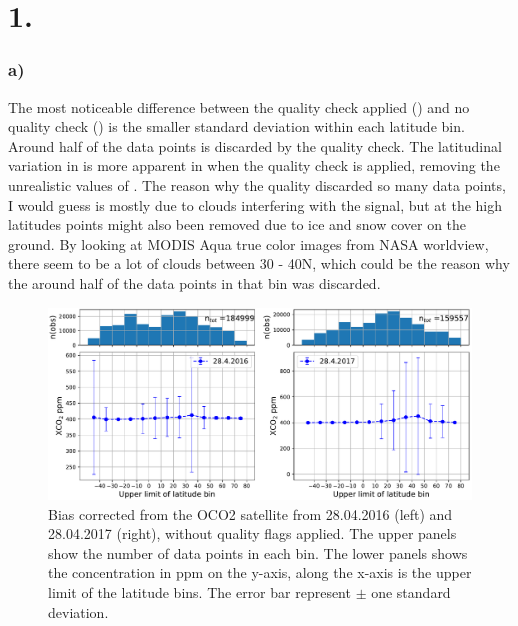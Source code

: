 \section*{1.}

\subsubsection*{a)}

The most noticeable difference between the quality check applied
() and no quality check ()
is the smaller standard deviation within each latitude bin. Around half of the
data points is discarded by the quality check. The latitudinal variation in
 is more apparent in when the quality check is applied, removing the
unrealistic values of . The reason why the quality discarded so many
data points, I would guess is mostly due to clouds interfering with the signal,
but at the high latitudes points might also been removed due to ice and snow
cover on the ground. By looking at MODIS Aqua true color images from NASA
worldview, there seem to be a lot of clouds between 30 - 40\degree N, which could
be the reason why the around half of the data points in that bin was discarded.   
\begin{figure}[htbp]
    \includegraphics[width=\textwidth]{../xCO2.pdf}
    \caption{Bias corrected  from the OCO2 satellite from 28.04.2016 (left) 
    and 28.04.2017 (right), without quality flags applied. The upper panels 
    show the number of data points in each bin. The lower panels shows the  
    concentration in ppm on the y-axis, along the x-axis is the upper limit of
    the latitude bins. The error bar represent $\pm$ one standard deviation.}
    \label{fig:no_qa_xco2}

\end{figure}


